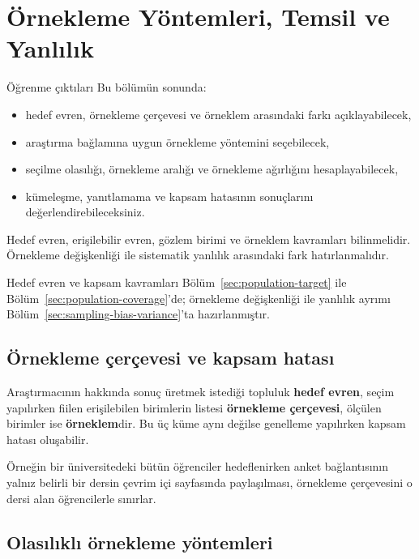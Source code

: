 \chapter{Örnekleme Yöntemleri, Temsil ve Yanlılık}
\label{ch:sampling-design}

\begin{prismbox}[PrismLight]{Öğrenme çıktıları}
Bu bölümün sonunda:
\begin{itemize}
  \item hedef evren, örnekleme çerçevesi ve örneklem arasındaki farkı açıklayabilecek,
  \item araştırma bağlamına uygun örnekleme yöntemini seçebilecek,
  \item seçilme olasılığı, örnekleme aralığı ve örnekleme ağırlığını hesaplayabilecek,
  \item kümeleşme, yanıtlamama ve kapsam hatasının sonuçlarını değerlendirebileceksiniz.
\end{itemize}
\end{prismbox}

\begin{prerequisitebox}
Hedef evren, erişilebilir evren, gözlem birimi ve örneklem kavramları
bilinmelidir. Örnekleme değişkenliği ile sistematik yanlılık arasındaki fark
hatırlanmalıdır.
\end{prerequisitebox}

Hedef evren ve kapsam kavramları Bölüm~\ref{sec:population-target} ile
Bölüm~\ref{sec:population-coverage}'de; örnekleme değişkenliği ile yanlılık
ayrımı Bölüm~\ref{sec:sampling-bias-variance}'ta hazırlanmıştır.

\section{Örnekleme çerçevesi ve kapsam hatası}
\label{sec:sampling-frame}

Araştırmacının hakkında sonuç üretmek istediği topluluk \textbf{hedef evren},
seçim yapılırken fiilen erişilebilen birimlerin listesi \textbf{örnekleme
çerçevesi}, ölçülen birimler ise \textbf{örneklem}dir. Bu üç küme aynı değilse
genelleme yapılırken kapsam hatası oluşabilir.

Örneğin bir üniversitedeki bütün öğrenciler hedeflenirken anket bağlantısının
yalnız belirli bir dersin çevrim içi sayfasında paylaşılması, örnekleme
çerçevesini o dersi alan öğrencilerle sınırlar.

\section{Olasılıklı örnekleme yöntemleri}
\label{sec:sampling-probability}

